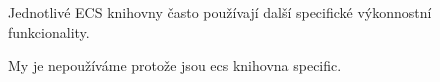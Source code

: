 Jednotlivé ECS knihovny často používají další specifické výkonnostní funkcionality.

My je nepoužíváme protože jsou ecs knihovna specific.


























